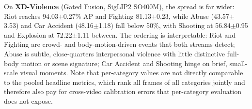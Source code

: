 On \textbf{XD-Violence} (Gated Fusion, SigLIP2 SO400M), the spread is far
wider: Riot reaches 94.03$\pm$0.27\% AP and Fighting 81.13$\pm$0.23, while
Abuse (43.57$\pm$3.53) and Car Accident (48.16$\pm$1.18) fall below 50\%, with
Shooting at 56.84$\pm$0.95 and Explosion at 72.22$\pm$1.11 between. The
ordering is interpretable: Riot and Fighting are crowd- and body-motion-driven
events that both streams detect; Abuse is subtle, close-quarters interpersonal
violence with little distinctive full-body motion or scene signature; Car
Accident and Shooting hinge on brief, small-scale visual moments. Note that
per-category values are not directly comparable to the pooled headline
metrics, which rank all frames of all categories jointly and therefore also
pay for cross-video calibration errors that per-category evaluation does not
expose.

